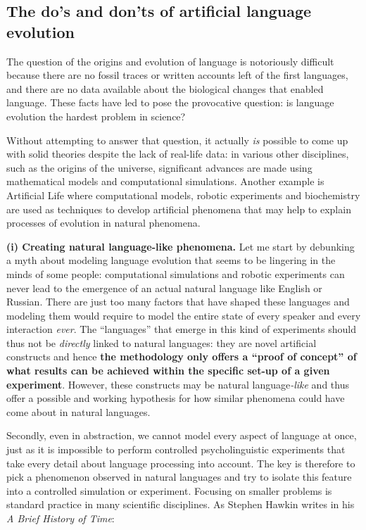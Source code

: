 \subsection{The do's and don'ts of artificial language evolution}
\label{s:methodology}

The question of the origins and evolution of language is notoriously difficult because there are no fossil traces or written accounts left of the first languages, and there are no data available about the biological changes that enabled language. These facts have led \citet{kirby03language} to pose the provocative question: is language evolution the hardest problem in science?

Without attempting to answer that question, it actually {\em is} possible to come up with solid theories despite the lack of real-life data: in various other disciplines, such as the origins of the universe, significant advances are made using mathematical models and computational simulations. Another example is Artificial Life where computational models, robotic experiments and biochemistry are used as techniques to develop artificial phenomena that may help to explain processes of evolution in natural phenomena.

{\bfseries (i) Creating natural language-like phenomena.} Let me start by debunking a myth about modeling language evolution that seems to be lingering in the minds of some people: computational simulations and robotic experiments can never lead to the emergence of an actual natural language like English or Russian. There are just too many factors that have shaped these languages and modeling them would require to model the entire state of every speaker and every interaction {\em ever}. The ``languages'' that emerge in this kind of experiments should thus not be {\em directly} linked to natural languages: they are novel artificial constructs and hence {\bfseries the methodology only offers a ``proof of concept'' of what results can be achieved within the specific set-up of a given experiment}. However, these constructs may be natural language{\em -like} and thus offer a possible and working hypothesis for how similar phenomena could have come about in natural languages.

Secondly, even in abstraction, we cannot model every aspect of language at once, just as it is impossible to perform controlled psycholinguistic experiments that take every detail about language processing into account. The key is therefore to pick a phenomenon observed in natural languages and try to isolate this feature into a controlled simulation or experiment. Focusing on smaller problems is standard practice in many scientific disciplines. As Stephen Hawkin writes in his {\em A Brief History of Time}:

